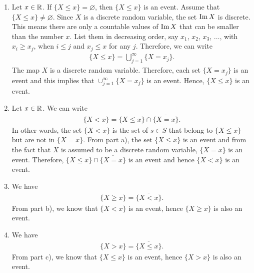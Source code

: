     \begin{problem}
    \begin{enumerate}[label=\alph*)]
        \item Let $x \in \mathbb{R}$. If $\{ X \leq x \} = \varnothing$, then $\{ X \leq x \}$ is an event. Assume that $\{ X \leq x \} \neq \varnothing$. Since $X$ is a discrete random variable, the set $\operatorname{Im} X$ is discrete. This means there are only a countable values of $\operatorname{Im} X$ that can be smaller than the number $x$. List them in decreasing order, say $x_1$, $x_2$, $x_3$, $\ldots$, with $x_i \geq x_j$, when $i \leq j$ and $x_j \leq x$ for any $j$. Therefore, we can write
            \begin{align*}
            \{ X \leq x \} = \bigcup_{j = 1}^\infty \{ X = x_j \} .
            \end{align*} 
        The map $X$ is a discrete random variable. Therefore, each set $\{ X = x_j \}$ is an event and this implies that $\cup_{j = 1}^\infty \{ X = x_j \}$ is an event. Hence, $\{ X \leq x \}$ is an event.
        \item Let $x \in \mathbb{R}$. We can write
            \begin{align*}
            \{ X < x \} = \{ X \leq x \} \cap \overline{\{ X = x \} } .
            \end{align*} 
        In other words, the set $\{ X < x \}$ is the set of $s \in S$ that belong to $\{ X \leq x \}$ but are not in $\{ X = x \}$. From part a), the set $\{ X \leq x \}$ is an event and from the fact that $X$ is assumed to be a discrete random variable, $\{ X = x \}$ is an event. Therefore, $\{ X \leq x \} \cap \overline{\{ X = x \}}$ is an event and hence $\{ X < x \}$ is an event.
        \item We have
            \begin{align*}
            \{ X \geq x \} = \overline{\{ X < x \}} .
            \end{align*} 
        From part b), we know that $\{ X < x \}$ is an event, hence $\{ X \geq x \}$ is also an event.
        \item We have
            \begin{align*}
            \{ X > x \} = \overline{\{ X \leq x \}}.
            \end{align*} 
        From part c), we know that $\{ X \leq x \}$ is an event, hence $\{ X > x \}$ is also an event.
    \end{enumerate}
    \end{problem}

